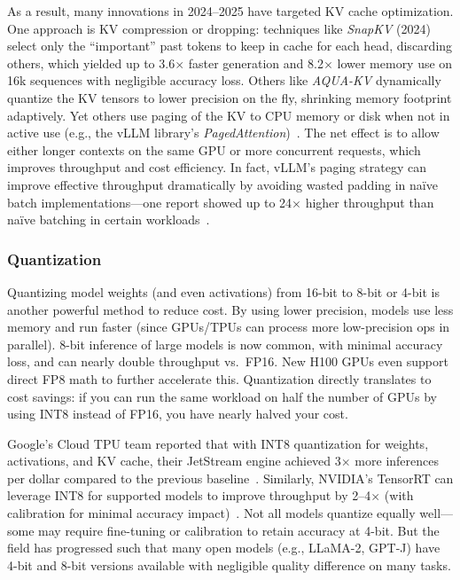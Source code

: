 As a result, many innovations in 2024–2025 have targeted KV cache optimization. One approach is KV compression or dropping: techniques like \emph{SnapKV} (2024) select only the “important” past tokens to keep in cache for each head, discarding others, which yielded up to 3.6$\times$ faster generation and 8.2$\times$ lower memory use on 16k sequences with negligible accuracy loss. Others like \emph{AQUA-KV} dynamically quantize the KV tensors to lower precision on the fly, shrinking memory footprint adaptively. Yet others use paging of the KV to CPU memory or disk when not in active use (e.g., the vLLM library’s \emph{PagedAttention})~\cite{vllm-pagedattention,pagedattention_paper}. The net effect is to allow either longer contexts on the same GPU or more concurrent requests, which improves throughput and cost efficiency. In fact, vLLM’s paging strategy can improve effective throughput dramatically by avoiding wasted padding in naïve batch implementations---one report showed up to 24$\times$ higher throughput than naïve batching in certain workloads~\cite{vllm-pagedattention,pagedattention_paper}.

\subsubsection{Quantization} 
Quantizing model weights (and even activations) from 16-bit to 8-bit or 4-bit is another powerful method to reduce cost. By using lower precision, models use less memory and run faster (since GPUs/TPUs can process more low-precision ops in parallel). 8-bit inference of large models is now common, with minimal accuracy loss, and can nearly double throughput vs.\ FP16. New H100 GPUs even support direct FP8 math to further accelerate this. Quantization directly translates to cost savings: if you can run the same workload on half the number of GPUs by using INT8 instead of FP16, you have nearly halved your cost. 

Google’s Cloud TPU team reported that with INT8 quantization for weights, activations, and KV cache, their JetStream engine achieved 3$\times$ more inferences per dollar compared to the previous baseline~\cite{jouppi2023-tpuv4}. Similarly, NVIDIA’s TensorRT can leverage INT8 for supported models to improve throughput by 2–4$\times$ (with calibration for minimal accuracy impact)~\cite{tensorrtllm-github,tensorrt_llm_docs}. Not all models quantize equally well---some may require fine-tuning or calibration to retain accuracy at 4-bit. But the field has progressed such that many open models (e.g., LLaMA-2, GPT-J) have 4-bit and 8-bit versions available with negligible quality difference on many tasks. 

